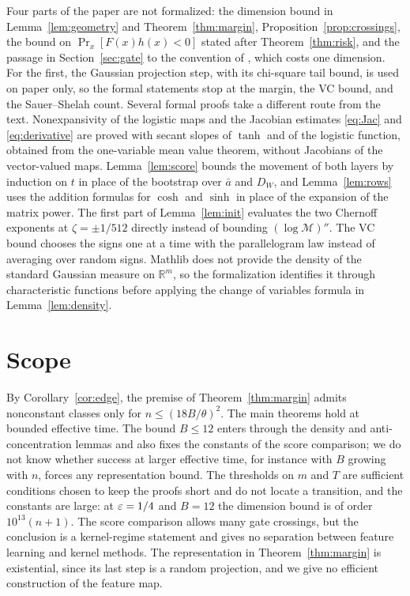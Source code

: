 \documentclass[11pt,letterpaper,pmlr,twoside]{jmlr}
\newcommand{\R}{\mathbb R}\newcommand{\E}{\mathbb E}
\begin{document}
Four parts of the paper are not formalized: the dimension bound in Lemma~\ref{lem:geometry} and Theorem~\ref{thm:margin}, Proposition~\ref{prop:crossings}, the bound on $\Pr_x[F(x)h(x)<0]$ stated after Theorem~\ref{thm:risk}, and the passage in Section~\ref{sec:gate} to the convention of \citet{KMS20}, which costs one dimension. For the first, the Gaussian projection step, with its chi-square tail bound, is used on paper only, so the formal statements stop at the margin, the VC bound, and the Sauer--Shelah count. Several formal proofs take a different route from the text. Nonexpansivity of the logistic maps and the Jacobian estimates \eqref{eq:Jac} and \eqref{eq:derivative} are proved with secant slopes of $\tanh$ and of the logistic function, obtained from the one-variable mean value theorem, without Jacobians of the vector-valued maps. Lemma~\ref{lem:score} bounds the movement of both layers by induction on $t$ in place of the bootstrap over $\bar a$ and $D_W$, and Lemma~\ref{lem:rows} uses the addition formulas for $\cosh$ and $\sinh$ in place of the expansion of the matrix power. The first part of Lemma~\ref{lem:init} evaluates the two Chernoff exponents at $\zeta=\pm1/512$ directly instead of bounding $(\log\mathcal M)''$. The VC bound chooses the signs one at a time with the parallelogram law instead of averaging over random signs. Mathlib does not provide the density of the standard Gaussian measure on $\R^m$, so the formalization identifies it through characteristic functions before applying the change of variables formula in Lemma~\ref{lem:density}.

\section{Scope}
By Corollary~\ref{cor:edge}, the premise of Theorem~\ref{thm:margin} admits nonconstant classes only for $n\le(18B/\theta)^2$. The main theorems hold at bounded effective time. The bound $B\le12$ enters through the density and anti-concentration lemmas and also fixes the constants of the score comparison; we do not know whether success at larger effective time, for instance with $B$ growing with $n$, forces any representation bound. The thresholds on $m$ and $T$ are sufficient conditions chosen to keep the proofs short and do not locate a transition, and the constants are large: at $\varepsilon=1/4$ and $B=12$ the dimension bound is of order $10^{13}(n+1)$. The score comparison allows many gate crossings, but the conclusion is a kernel-regime statement and gives no separation between feature learning and kernel methods. The representation in Theorem~\ref{thm:margin} is existential, since its last step is a random projection, and we give no efficient construction of the feature map.
\end{document}
